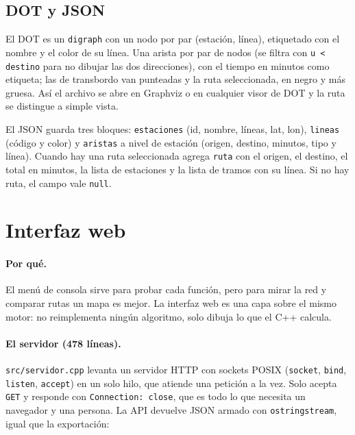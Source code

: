 \documentclass[11pt,a4paper]{article}
\newcommand{\arch}[1]{\texttt{#1}}
\begin{document}
\subsection{DOT y JSON}

El DOT es un \arch{digraph} con un nodo por par (estación, línea), etiquetado con
el nombre y el color de su línea. Una arista por par de nodos (se filtra con
\arch{u < destino} para no dibujar las dos direcciones), con el tiempo en minutos
como etiqueta; las de transbordo van punteadas y la ruta seleccionada, en negro y
más gruesa. Así el archivo se abre en Graphviz o en cualquier visor de DOT y la
ruta se distingue a simple vista.

El JSON guarda tres bloques: \arch{estaciones} (id, nombre, líneas, lat, lon),
\arch{lineas} (código y color) y \arch{aristas} a nivel de estación (origen,
destino, minutos, tipo y línea). Cuando hay una ruta seleccionada agrega
\arch{ruta} con el origen, el destino, el total en minutos, la lista de estaciones
y la lista de tramos con su línea. Si no hay ruta, el campo vale \arch{null}.


\section{Interfaz web}

\paragraph{Por qué.}
El menú de consola sirve para probar cada función, pero para mirar la red y
comparar rutas un mapa es mejor. La interfaz web es una capa sobre el mismo
motor: no reimplementa ningún algoritmo, solo dibuja lo que el C++ calcula.

\paragraph{El servidor (478 líneas).}
\arch{src/servidor.cpp} levanta un servidor HTTP con sockets POSIX
(\arch{socket}, \arch{bind}, \arch{listen}, \arch{accept}) en un solo hilo, que
atiende una petición a la vez. Solo acepta \arch{GET} y responde con
\arch{Connection: close}, que es todo lo que necesita un navegador y una persona.
La API devuelve JSON armado con \arch{ostringstream}, igual que la exportación:
\end{document}
